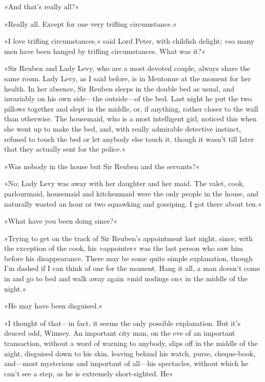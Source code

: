 »And that's really all?«

»Really all. Except for one very trifling circumstance.«

»I love trifling circumstances,« said Lord Peter, with childish delight; »so many men have been hanged by trifling circumstances. What was it?«

»Sir Reuben and Lady Levy, who are a most devoted couple, always share the same room. Lady Levy, as I said before, is in Mentonne at the moment for her health. In her absence, Sir Reuben sleeps in the double bed as usual, and invariably on his own side\allowbreak---\allowbreak the outside\allowbreak---\allowbreak of the bed. Last night he put the two pillows together and slept in the middle, or, if anything, rather closer to the wall than otherwise. The housemaid, who is a most intelligent girl, noticed this when she went up to make the bed, and, with really admirable detective instinct, refused to touch the bed or let anybody else touch it, though it wasn't till later that they actually sent for the police.«

»Was nobody in the house but Sir Reuben and the servants?«

»No; Lady Levy was away with her daughter and her maid. The valet, cook, parlourmaid, housemaid and kitchenmaid were the only people in the house, and naturally wasted an hour or two squawking and gossiping. I got there about ten.«

»What have you been doing since?«

»Trying to get on the track of Sir Reuben's appointment last night, since, with the exception of the cook, his »appointer« was the last person who saw him before his disappearance. There may be some quite simple explanation, though I'm dashed if I can think of one for the moment. Hang it all, a man doesn't come in and go to bed and walk away again »mid nodings on« in the middle of the night.«

»He may have been disguised.«

»I thought of that\allowbreak---\allowbreak in fact, it seems the only possible explanation. But it's deuced odd, Wimsey. An important city man, on the eve of an important transaction, without a word of warning to anybody, slips off in the middle of the night, disguised down to his skin, leaving behind his watch, purse, cheque-book, and\allowbreak---\allowbreak most mysterious and important of all\allowbreak---\allowbreak his spectacles, without which he can't see a step, as he is extremely short-sighted. He\longdash«


